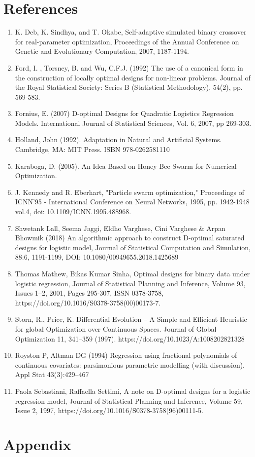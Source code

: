 \documentclass[11pt,a4paper]{article}
\begin{document}
\section{References}
\begin{enumerate}
\item K. Deb, K. Sindhya, and T. Okabe, Self-adaptive simulated binary
crossover for real-parameter optimization, Proceedings of the Annual
Conference on Genetic and Evolutionary Computation, 2007, 1187-1194.

\item Ford, I. , Torsney, B. and Wu, C.F.J. (1992) The use of a canonical form in the construction of locally optimal designs for non-linear problems. Journal of the Royal Statistical Society: Series B (Statistical Methodology), 54(2), pp. 569-583. 
\item Fornius, E. (2007) D-optimal Designs for Quadratic Logistics Regression Models. International Journal of Statistical Sciences, Vol. 6, 2007, pp 269-303.

\item Holland, John (1992). Adaptation in Natural and Artificial Systems. Cambridge, MA: MIT Press. ISBN 978-0262581110
\item Karaboga, D. (2005). An Idea Based on Honey Bee Swarm for Numerical Optimization.
\item J. Kennedy and R. Eberhart, "Particle swarm optimization," Proceedings of ICNN'95 - International Conference on Neural Networks, 1995, pp. 1942-1948 vol.4, doi: 10.1109/ICNN.1995.488968.
\item  Shwetank Lall, Seema Jaggi, Eldho Varghese, Cini Varghese \& Arpan Bhowmik (2018) An algorithmic approach to construct D-optimal saturated designs for logistic model, Journal of Statistical Computation and Simulation, 88:6, 1191-1199, DOI: 10.1080/00949655.2018.1425689 

\item Thomas Mathew, Bikas Kumar Sinha,
Optimal designs for binary data under logistic regression,
Journal of Statistical Planning and Inference,
Volume 93, Issues 1–2,
2001,
Pages 295-307,
ISSN 0378-3758,
https://doi.org/10.1016/S0378-3758(00)00173-7.

\item Storn, R., Price, K. Differential Evolution – A Simple and Efficient Heuristic for global Optimization over Continuous Spaces. Journal of Global Optimization 11, 341–359 (1997). https://doi.org/10.1023/A:1008202821328

\item Royston P, Altman DG (1994) Regression using fractional polynomials of continuous covariates: parsimonious parametric modelling (with discussion). Appl Stat 43(3):429–467

\item Paola Sebastiani, Raffaella Settimi,
A note on D-optimal designs for a logistic regression model,
Journal of Statistical Planning and Inference,
Volume 59, Issue 2, 
1997, 
https://doi.org/10.1016/S0378-3758(96)00111-5.


\end{enumerate}


\newpage

\section{Appendix}
\end{document}
